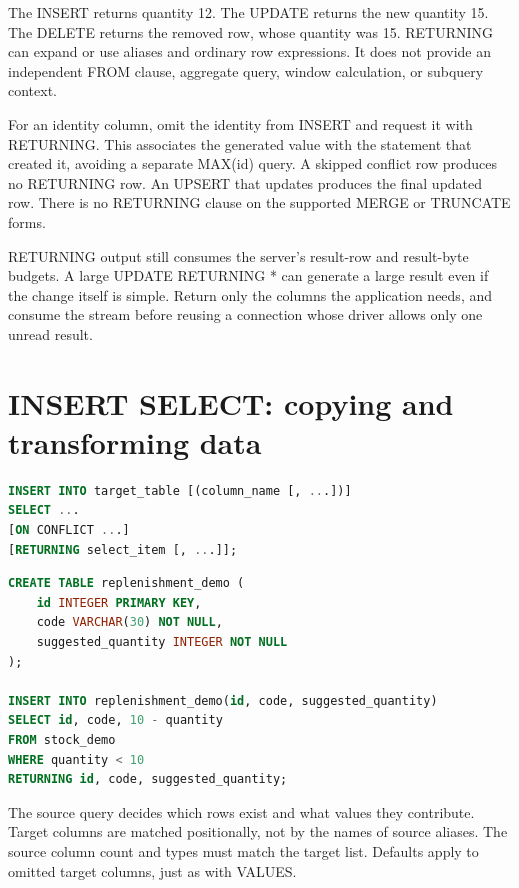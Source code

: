 The INSERT returns quantity 12. The UPDATE returns the new quantity 15. The DELETE returns the removed row, whose quantity was 15. RETURNING can expand \code{*} or use aliases and ordinary row expressions. It does not provide an independent FROM clause, aggregate query, window calculation, or subquery context.

For an identity column, omit the identity from INSERT and request it with RETURNING. This associates the generated value with the statement that created it, avoiding a separate MAX(id) query. A skipped conflict row produces no RETURNING row. An UPSERT that updates produces the final updated row. There is no RETURNING clause on the supported MERGE or TRUNCATE forms.

RETURNING output still consumes the server's result-row and result-byte budgets. A large UPDATE RETURNING * can generate a large result even if the change itself is simple. Return only the columns the application needs, and consume the stream before reusing a connection whose driver allows only one unread result.


\section{INSERT SELECT: copying and transforming data}

\begin{lstlisting}[language=SQL]
INSERT INTO target_table [(column_name [, ...])]
SELECT ...
[ON CONFLICT ...]
[RETURNING select_item [, ...]];
\end{lstlisting}

\begin{lstlisting}[language=SQL]
CREATE TABLE replenishment_demo (
    id INTEGER PRIMARY KEY,
    code VARCHAR(30) NOT NULL,
    suggested_quantity INTEGER NOT NULL
);

INSERT INTO replenishment_demo(id, code, suggested_quantity)
SELECT id, code, 10 - quantity
FROM stock_demo
WHERE quantity < 10
RETURNING id, code, suggested_quantity;
\end{lstlisting}

The source query decides which rows exist and what values they contribute. Target columns are matched positionally, not by the names of source aliases. The source column count and types must match the target list. Defaults apply to omitted target columns, just as with VALUES.

